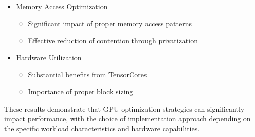 \documentclass[9pt]{IEEEtran}
\begin{document}
\begin{itemize}
    \item Memory Access Optimization
    \begin{itemize}
        \item Significant impact of proper memory access patterns
        \item Effective reduction of contention through privatization
    \end{itemize}
    \item Hardware Utilization
    \begin{itemize}
        \item Substantial benefits from TensorCores
        \item Importance of proper block sizing
    \end{itemize}
\end{itemize}

These results demonstrate that GPU optimization strategies can significantly impact performance, with the choice of implementation approach depending on the specific workload characteristics and hardware capabilities.
\end{document}
